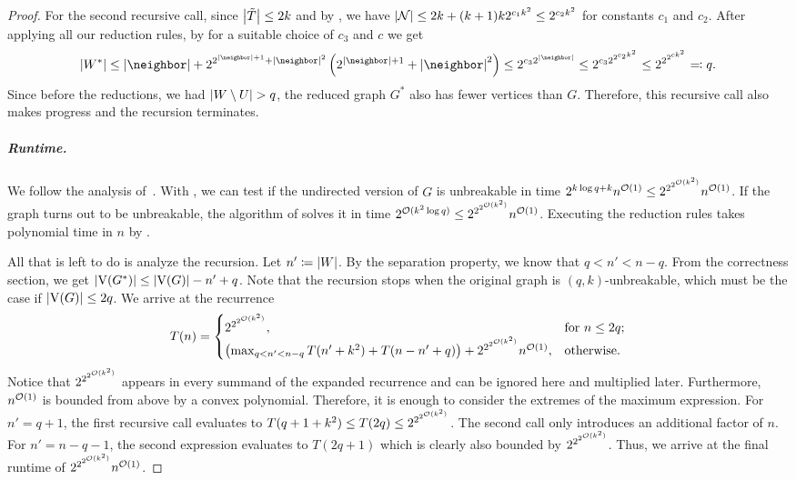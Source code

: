 \begin{theorem}
\begin{lemma}
\begin{theorem}
\begin{lemma}
\begin{reduction*}
\begin{reduction*}
\begin{reduction*}
\begin{reduction*}
\begin{lemma}
\begin{lemma}
\begin{theorem}
\begin{proof}
  For the second recursive call, since $\abs{\tilde{T}} \le 2k$ and by , we have $\abs{\mathcal{N}} \le 2k + (k+1)k2^{c_1k^2} \le 2^{c_2k^2}$ for constants $c_1$ and $c_2$.
  After applying all our reduction rules, by  for a suitable choice of $c_3$ and $c$ we get \[\abs{W^*} \le \abs{\neighbor} + 2^{2^{\abs{\neighbor}+1} + \abs{\neighbor}^2}\left(2^{\abs{\neighbor}+1} + \abs{\neighbor}^2\right) \le 2^{c_3 2^{\abs{\neighbor}}} \le 2^{c_32^{2^{c_2k^2}}} \le 2^{2^{2^{ck^2}}} \eqqcolon q.\]
  Since before the reductions, we had $\abs{W \setminus U} > q$, the reduced graph $G^*$ also has fewer vertices than $G$. Therefore, this recursive call also makes progress and the recursion terminates.

  \subparagraph*{Runtime.} 
  We follow the analysis of~\cite{chitnis2016designing}. With , we can test
  if the undirected version of $G$ is unbreakable in time $2^{k\log{q+k}}n^{\mathcal{O}(1)} \le 2^{2^{2^{\mathcal{O}(k^2)}}}n^{\mathcal{O}(1)}$.
  If the graph turns out to be unbreakable, the algorithm of  solves it in time $2^{\mathcal{O}(k^2\log{q})} \le 2^{2^{2^{\mathcal{O}(k^2)}}}n^{\mathcal{O}(1)}$.
  Executing the reduction rules takes polynomial time in $n$ by . 

  All that is left to do is analyze the recursion. Let $n' \coloneqq \abs{W}$. By the separation property, we know that $q < n' < n-q$. From the correctness section, we get $\abs{\ve{G^*}} \le \abs{\ve{G}} - n' + q$. 
  Note that the recursion stops when the original graph is $(q,k)$-unbreakable, which must be the case if $\abs{\ve{G}} \le 2q$.
  We arrive at the recurrence 
  \[
    T(n) = \begin{cases}2^{2^{2^{\mathcal{O}(k^2)}}}, & \text{for $n \le 2q$;}\\
    \left(\max_{q < n' < n-q} T(n' + k^2) + T(n - n' + q)\right) + 2^{2^{2^{\mathcal{O}(k^2)}}}n^{\mathcal{O}(1)},  & \text{otherwise.} \end{cases}
  \]
  Notice that $2^{2^{2^{\mathcal{O}(k^2)}}}$ appears in every summand of the expanded recurrence and can be ignored here and multiplied later. Furthermore, $n^{\mathcal{O}(1)}$ is bounded from above by a convex polynomial. Therefore, it is enough to consider the extremes of the maximum expression. For $n' = q+1$, the first recursive call evaluates to $T(q+1+k^2) \le T(2q) \le 2^{2^{2^{\mathcal{O}(k^2)}}}$. The second call only introduces an additional factor of $n$. For $n' = n-q-1$, the second expression evaluates to $T(2q+1)$ which is clearly also bounded by $2^{2^{2^{\mathcal{O}(k^2)}}}$. Thus, we arrive at the final runtime of $2^{2^{2^{\mathcal{O}(k^2)}}}n^{\mathcal{O}(1)}$.
\end{proof}
\fi


\end{theorem}
\end{lemma}
\end{lemma}
\end{reduction*}
\end{reduction*}
\end{reduction*}
\end{reduction*}
\end{lemma}
\end{theorem}
\end{lemma}
\end{theorem}
